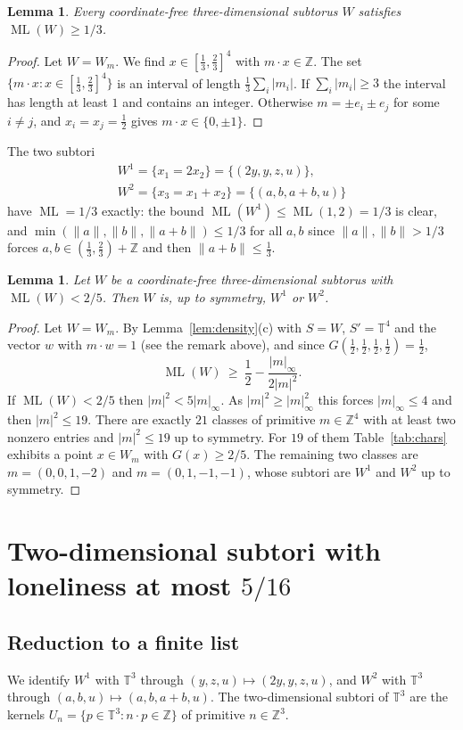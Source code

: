 \documentclass[12pt]{amsart}
\newtheorem{lemma}[theorem]{Lemma}
\theoremstyle{definition}\newtheorem{definition}[theorem]{Definition}
\theoremstyle{remark}\newtheorem{remark}[theorem]{Remark}
\newcommand{\Z}{\mathbb Z}\newcommand{\R}{\mathbb R}\newcommand{\T}{\mathbb T}
\newcommand{\norm}[1]{\lVert #1\rVert}
\newcommand{\ML}{\operatorname{ML}}
\newcommand{\supn}[1]{\lvert #1\rvert_\infty}
\newcommand{\eucl}[1]{\lvert #1\rvert}
\newcommand{\Wone}{W^{1}}\newcommand{\Wtwo}{W^{2}}
\begin{document}
\begin{lemma}\label{lem:W13}
Every coordinate-free three-dimensional subtorus $W$ satisfies $\ML(W)\ge 1/3$.
\end{lemma}
\begin{proof}
Let $W=W_m$. We find $x\in[\frac13,\frac23]^4$ with $m\cdot x\in\Z$. The set $\{m\cdot x: x\in[\frac13,\frac23]^4\}$ is an interval of length $\frac13\sum_i|m_i|$. If $\sum_i|m_i|\ge 3$ the interval has length at least $1$ and contains an integer. Otherwise $m=\pm e_i\pm e_j$ for some $i\ne j$, and $x_i=x_j=\frac12$ gives $m\cdot x\in\{0,\pm1\}$.
\end{proof}

The two subtori
\begin{gather*}
 \Wone=\{x_1=2x_2\}=\{(2y,y,z,u)\},\\ \Wtwo=\{x_3=x_1+x_2\}=\{(a,b,a+b,u)\}
\end{gather*}
have $\ML=1/3$ exactly: the bound $\ML(\Wone)\le\ML(1,2)=1/3$ is clear, and $\min(\norm a,\norm b,\norm{a+b})\le 1/3$ for all $a,b$ since $\norm a,\norm b>1/3$ forces $a,b\in(\frac13,\frac23)+\Z$ and then $\norm{a+b}\le\frac13$.

\begin{lemma}\label{lem:W25}
Let $W$ be a coordinate-free three-dimensional subtorus with $\ML(W)<2/5$. Then $W$ is, up to symmetry, $\Wone$ or $\Wtwo$.
\end{lemma}
\begin{proof}
Let $W=W_m$. By Lemma~\ref{lem:density}(c) with $S=W$, $S'=\T^4$ and the vector $w$ with $m\cdot w=1$ (see the remark above), and since $G(\frac12,\frac12,\frac12,\frac12)=\frac12$,
\[
 \ML(W)\ \ge\ \frac12-\frac{\supn m}{2\eucl m^2}.
\]
If $\ML(W)<2/5$ then $\eucl m^2<5\supn m$. As $\eucl m^2\ge\supn m^2$ this forces $\supn m\le 4$ and then $\eucl m^2\le 19$. There are exactly $21$ classes of primitive $m\in\Z^4$ with at least two nonzero entries and $\eucl m^2\le 19$ up to symmetry. For $19$ of them Table~\ref{tab:chars} exhibits a point $x\in W_m$ with $G(x)\ge 2/5$. The remaining two classes are $m=(0,0,1,-2)$ and $m=(0,1,-1,-1)$, whose subtori are $\Wone$ and $\Wtwo$ up to symmetry.
\end{proof}

\section{Two-dimensional subtori with loneliness at most $5/16$}\label{sec:two}
\subsection{Reduction to a finite list}
We identify $\Wone$ with $\T^3$ through $(y,z,u)\mapsto(2y,y,z,u)$, and $\Wtwo$ with $\T^3$ through $(a,b,u)\mapsto(a,b,a+b,u)$. The two-dimensional subtori of $\T^3$ are the kernels $U_n=\{p\in\T^3:n\cdot p\in\Z\}$ of primitive $n\in\Z^3$.
\end{document}
